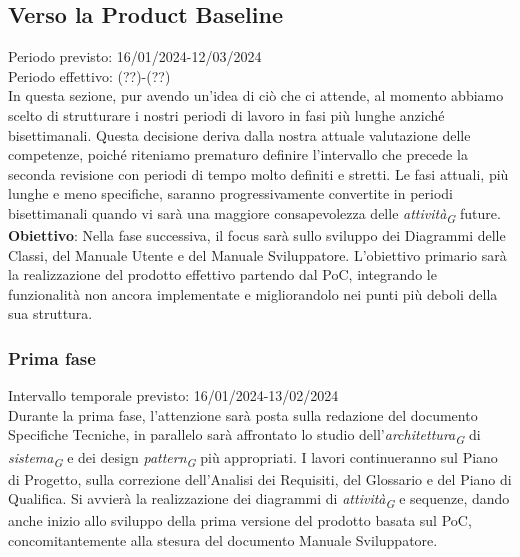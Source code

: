 \subsection{Verso la Product Baseline}
Periodo previsto: 16/01/2024-12/03/2024\\ 
\vspace{0.2cm} 
Periodo effettivo: (??)-(??)\\ 
\vspace{0.2cm} 
In questa sezione, pur avendo un'idea di ciò che ci attende, al momento abbiamo scelto di strutturare i nostri periodi di lavoro in fasi più lunghe anziché bisettimanali. Questa decisione deriva dalla nostra attuale valutazione delle competenze, poiché riteniamo prematuro definire l'intervallo che precede la seconda revisione con periodi di tempo molto definiti e stretti. 
Le fasi attuali, più lunghe e meno specifiche, saranno progressivamente convertite in periodi bisettimanali quando vi sarà una maggiore consapevolezza delle \textit{attività}\textsubscript{\textit{G}} future.  
\\ 
\vspace{0.2cm} 
\textbf{Obiettivo}: Nella fase successiva, il focus sarà sullo sviluppo dei Diagrammi delle Classi, del Manuale Utente e del Manuale Sviluppatore. L'obiettivo primario sarà la realizzazione del prodotto effettivo partendo dal PoC, integrando le funzionalità non ancora implementate e migliorandolo nei punti più deboli della sua struttura.\\ 
\vspace{0.2cm} 

\subsubsection{Prima fase}
Intervallo temporale previsto: 16/01/2024-13/02/2024\\ 
\vspace{0.2cm} 
Durante la prima fase, l'attenzione sarà posta sulla redazione del documento Specifiche Tecniche, in parallelo sarà affrontato lo studio dell'\textit{architettura}\textsubscript{\textit{G}} di \textit{sistema}\textsubscript{\textit{G}} e dei design \textit{pattern}\textsubscript{\textit{G}} più appropriati. I lavori continueranno sul Piano di Progetto, sulla correzione dell'Analisi dei Requisiti, del Glossario e del Piano di Qualifica. Si avvierà la realizzazione dei diagrammi di \textit{attività}\textsubscript{\textit{G}} e sequenze, dando anche inizio allo sviluppo della prima versione del prodotto basata sul PoC, concomitantemente alla stesura del documento Manuale Sviluppatore.


